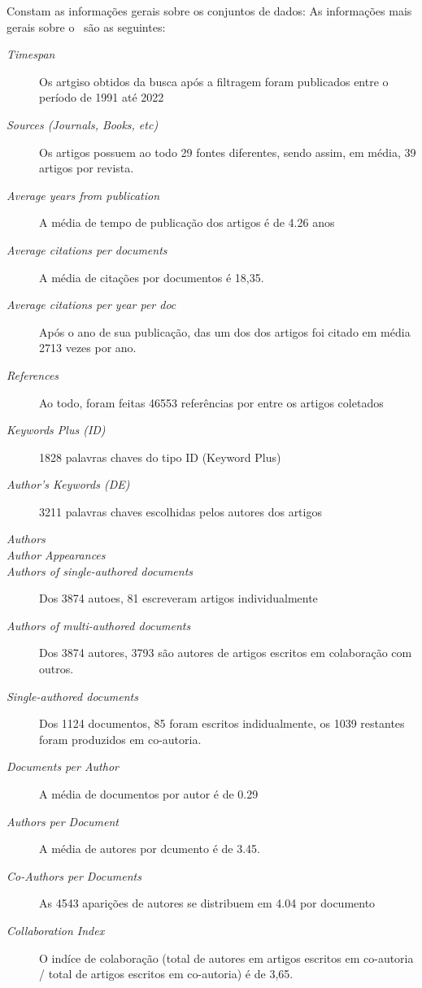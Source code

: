 Constam as informações gerais sobre os conjuntos de dados:
As informações mais gerais sobre o \dataset\   são as seguintes:
\begin{description}
    \item [\textit{Timespan}] Os artgiso obtidos da busca após a filtragem foram publicados entre o período de 1991 até 2022
    \item [\textit{Sources (Journals, Books, etc)}] Os artigos possuem ao todo 29 fontes diferentes, sendo assim, em média, 39 artigos por revista.
    \item [\textit{Average years from publication}] A média de tempo de publicação dos artigos é de 4.26 anos
    \item [\textit{Average citations per documents}] A média de citações por documentos é 18,35.
    \item [\textit{Average citations per year per doc}] Após o ano de sua publicação, das um dos dos artigos foi citado em média 2713 vezes por ano.
    \item [\textit{References}] Ao todo, foram feitas 46553  referências por entre os artigos coletados
    \item [\textit{Keywords Plus (ID)}] 1828 palavras chaves do tipo ID (Keyword Plus)
    \item [\textit{Author's Keywords (DE)}]  3211 palavras chaves escolhidas pelos autores dos artigos

    \item [\textit{Authors}]  
    \item [\textit{Author Appearances}] 
    \item [\textit{Authors of single-authored documents}] Dos 3874 autoes, 81 escreveram artigos individualmente
    \item [\textit{Authors of multi-authored documents}] Dos 3874 autores, 3793 são autores de artigos escritos em colaboração com outros.
    \item [\textit{Single-authored documents}] Dos 1124 documentos, 85 foram escritos indidualmente, os 1039 restantes foram produzidos em co-autoria.
    \item [\textit{Documents per Author}] A média de documentos por autor é de 0.29
    \item [\textit{Authors per Document}] A média de autores por dcumento é de 3.45.
    \item [\textit{Co-Authors per Documents}] As 4543 aparições de autores se distribuem em 4.04 por documento
    \item [\textit{Collaboration Index}] O indíce de colaboração (total de autores em artigos escritos em co-autoria / total de artigos escritos em co-autoria) é de 3,65.
\end{description}


